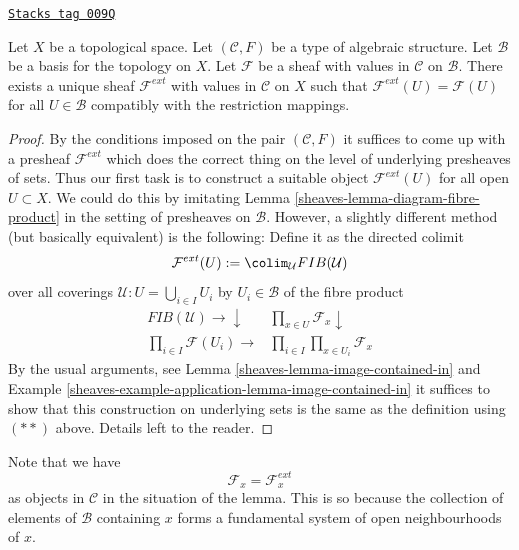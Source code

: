 \begin{lemma}
\label{sheaves-lemma-extend-off-basis-structures}
\href{https://stacks.math.columbia.edu/tag/009Q}{\texttt{Stacks tag 009Q}}

Let $X$ be a topological space. Let $(\mathcal{C}, F)$ be
a type of algebraic structure.
Let $\mathcal{B}$ be a basis for the topology on $X$.
Let $\mathcal{F}$ be a sheaf with values in $\mathcal{C}$
on $\mathcal{B}$.
There exists a unique sheaf $\mathcal{F}^{ext}$ with values in $\mathcal{C}$
on $X$ such that $\mathcal{F}^{ext}(U) = \mathcal{F}(U)$
for all $U \in \mathcal{B}$ compatibly with the restriction
mappings.
\end{lemma}

\begin{proof}

By the conditions imposed on the pair $(\mathcal{C}, F)$ it
suffices to come up with a presheaf $\mathcal{F}^{ext}$
which does the correct thing on the level of underlying
presheaves of sets. Thus our first task is to construct
a suitable object $\mathcal{F}^{ext}(U)$ for all open $U \subset X$.
We could do this by imitating
Lemma \ref{sheaves-lemma-diagram-fibre-product} in the setting
of presheaves on $\mathcal{B}$. However, a slightly different method
(but basically equivalent) is the following:
Define it as the directed colimit
$$
\mathcal{F}^{ext}(U)
:=
\colim_\mathcal{U} FIB(\mathcal{U})
$$
over all coverings
$\mathcal{U} : U = \bigcup_{i\in I} U_i$ by $U_i \in \mathcal{B}$
of the fibre product
$$
\begin{array}{cc}FIB(\mathcal{U}) \longrightarrow\downarrow & \prod\nolimits_{x\in U} \mathcal{F}_x \downarrow \\ \prod\nolimits_{i\in I} \mathcal{F}(U_i) \longrightarrow & \prod\nolimits_{i \in I} \prod\nolimits_{x\in U_i} \mathcal{F}_x\end{array}
$$
By the usual arguments, see Lemma \ref{sheaves-lemma-image-contained-in}
and Example \ref{sheaves-example-application-lemma-image-contained-in}
it suffices to show that this construction on underlying
sets is the same as the definition using $(**)$ above.
Details left to the reader.
\end{proof}

Note that we have
$$
\mathcal{F}_x = \mathcal{F}_x^{ext}
$$
as objects in $\mathcal{C}$
in the situation of the lemma. This is so because the
collection of elements of $\mathcal{B}$ containing
$x$ forms a fundamental system of open neighbourhoods of $x$.

